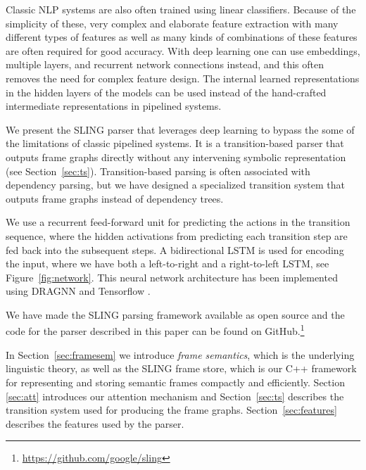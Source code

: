 \documentclass[11pt,a4paper]{article}
\begin{document}
Classic NLP systems are also often trained using linear classifiers.
Because of the simplicity of these, very complex and elaborate feature
extraction with many different types of features as well as many kinds
of combinations of these features are often required for good accuracy.
With deep learning one can use embeddings, multiple layers, and recurrent
network connections instead, and this often removes the need for complex
feature design. The internal learned representations in the hidden layers of
the models can be used instead of the hand-crafted intermediate representations
in pipelined systems.


We present the SLING parser that leverages deep learning to bypass the some of
the limitations of classic pipelined systems.
It is a transition-based parser that outputs frame graphs directly without any
intervening symbolic representation (see Section~\ref{sec:ts}). Transition-based
parsing is often associated with dependency parsing, but we have designed a
specialized transition system that outputs frame graphs instead of dependency
trees.

We use a recurrent feed-forward unit for predicting the actions in the
transition sequence, where the hidden activations from predicting each
transition step are fed back into the subsequent steps.
A bidirectional LSTM is used for encoding the input, where we have both a
left-to-right and a right-to-left LSTM, see Figure~\ref{fig:network}.
This neural network architecture has been implemented using DRAGNN \cite{dragnn}
and Tensorflow \cite{tensorflow}.

We have made the SLING parsing framework available as open source and the code
for the parser described in this paper can be found on GitHub.\footnote{\url{https://github.com/google/sling}}

In Section~\ref{sec:framesem} we introduce \emph{frame semantics}, which is the
underlying linguistic theory, as well as the SLING frame store, which is our
C++ framework for representing and storing semantic frames compactly and
efficiently.
Section \ref{sec:att} introduces our attention mechanism and
Section~\ref{sec:ts} describes the transition system used for producing the
frame graphs. Section~\ref{sec:features} describes the features used by the
parser.

\begin{figure*}[t]
  \centering
  
  \caption{Neural network architecture for SLING parser. The input is encoded by
  a bi-directional LSTM and the LSTM encoding is then feed into a recurrent
  feed-forward (FF) unit which predicts the actions for the transition system.
  The hidden layer activations as well as the transition system state is used
  for constructing the input feature vector for the next step. The FF unit is
  run repeatedly until the transition system has reached a terminal state.}
  \label{fig:network}
\end{figure*}
\end{document}
